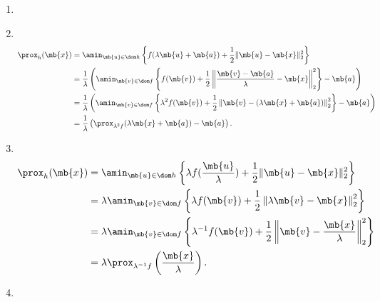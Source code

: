 \begin{exercise}
\begin{enumerate}
            \begin{solution}
                \begin{enumerate}
                    \item []
                    \item ~\vspace{-5ex}
                        \begin{align*}
                            \prox_h(\mb{x}) & = \amin_{\mb{u}\in\dom h}\left\{f(\lambda\mb{u}+\mb{a})+\frac{1}{2}\|\mb{u}-\mb{x}\|_2^2\right\}                                                              \\
                                            & = \frac{1}{\lambda}\left(\amin_{\mb{v}\in\dom f}\left\{f(\mb{v})+\frac{1}{2}\left\|\frac{\mb{v}-\mb{a}}{\lambda}-\mb{x}\right\|_2^2\right\}-\mb{a}\right)     \\
                                            & = \frac{1}{\lambda}\left(\amin_{\mb{v}\in\dom f}\left\{\lambda^2 f(\mb{v})+\frac{1}{2}\left\|\mb{v}-(\lambda\mb{x}+\mb{a})\right\|_2^2\right\} -\mb{a}\right) \\
                                            & = \frac{1}{\lambda}\left(\prox_{\lambda^2 f}(\lambda\mb{x}+\mb{a})-\mb{a}\right).
                        \end{align*}
                    \item ~\vspace{-5ex}
                        \begin{align*}
                            \prox_h(\mb{x}) & = \amin_{\mb{u}\in\dom h}\left\{\lambda f(\frac{\mb{u}}{\lambda})+\frac{1}{2}\|\mb{u}-\mb{x}\|_2^2\right\}                        \\
                                            & = \lambda\amin_{\mb{v}\in\dom f}\left\{\lambda f(\mb{v})+\frac{1}{2}\left\|\lambda\mb{v}-\mb{x}\right\|_2^2\right\}               \\
                                            & = \lambda\amin_{\mb{v}\in\dom f}\left\{\lambda^{-1} f(\mb{v})+\frac{1}{2}\left\|\mb{v}-\frac{\mb{x}}{\lambda}\right\|_2^2\right\} \\
                                            & = \lambda\prox_{\lambda^{-1} f}\left(\frac{\mb{x}}{\lambda}\right).
                        \end{align*}
                    \item ~\vspace{-5ex}
                        \begin{align*}

\end{align*}
\end{enumerate}
\end{solution}
\end{enumerate}
\end{exercise}
